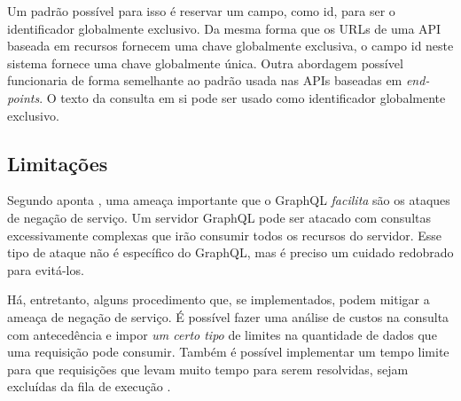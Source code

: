 Um padrão possível para isso é reservar um campo, como \textup{id}, para ser o identificador globalmente exclusivo. Da mesma forma que os URLs de uma API baseada em recursos fornecem uma chave globalmente exclusiva, o campo \textup{id} neste sistema fornece uma chave globalmente única. Outra abordagem possível funcionaria de forma semelhante ao padrão usada nas APIs baseadas em \textit{end-points}. O texto da consulta em si pode ser usado como identificador globalmente exclusivo. 

\subsection{Limitações}

Segundo aponta , uma ameaça importante que o GraphQL \emph{facilita} são os ataques de negação de serviço. Um servidor GraphQL pode ser atacado com consultas excessivamente complexas que irão consumir todos os recursos do servidor. Esse tipo de ataque não é específico do GraphQL, mas é preciso um cuidado redobrado para evitá-los.

Há, entretanto, alguns procedimento que, se implementados, podem mitigar a ameaça de negação de serviço. É possível fazer uma análise de custos na consulta com antecedência e impor \emph{um certo tipo} de limites na quantidade de dados que uma requisição pode consumir. Também é possível implementar um tempo limite para que requisições que levam muito tempo para serem resolvidas, sejam excluídas da fila de execução .


